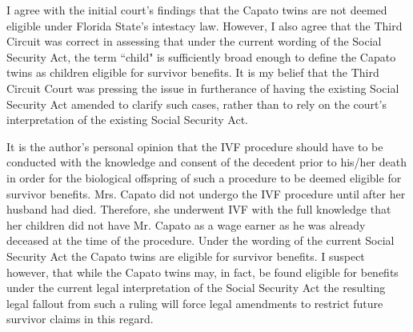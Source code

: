 \documentclass[letterpaper,10pt,twoside]{article}
\begin{document}
I agree with the initial court's findings that the Capato twins are not deemed eligible under Florida State's intestacy law.  However, I also agree that the Third Circuit was correct in assessing that under the current wording of the Social Security Act, the term ``child" is  sufficiently broad enough to define the Capato twins as children eligible for survivor benefits.  It is my belief that the Third Circuit Court was pressing the issue in furtherance of having the existing Social Security Act amended to clarify such cases, rather than to rely on the court's interpretation of the existing Social Security Act.

It is the author's personal opinion that the IVF procedure should have to be conducted with the knowledge and consent of the decedent prior to his/her death in order for the biological offspring of such a procedure to be deemed eligible for survivor benefits.  Mrs. Capato did not undergo the IVF procedure until after her husband had died.  Therefore, she underwent IVF with the full knowledge that her children did not have Mr. Capato as a wage earner as he was already deceased at the time of the procedure.  Under the wording of the current Social Security Act the Capato twins are eligible for survivor benefits.  I suspect however, that while the Capato twins may, in fact, be found eligible for benefits under the current legal interpretation of the Social Security Act the resulting legal fallout from such a ruling will force legal amendments to restrict future survivor claims in this regard.
\end{document}
